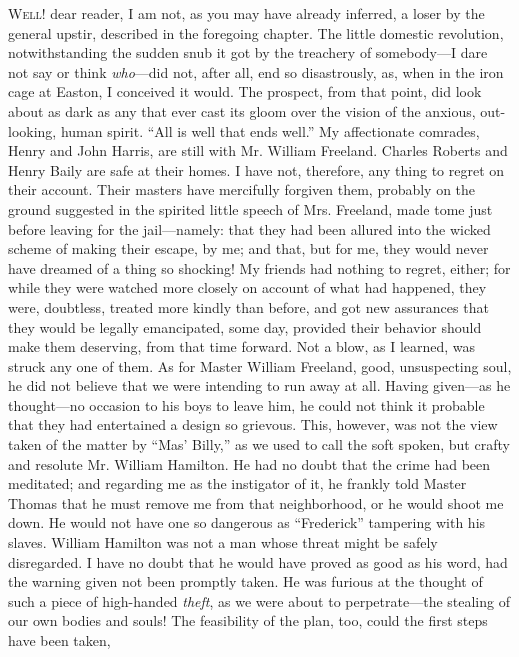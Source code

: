 \textsc{Well!} dear reader, I am not, as you may have already inferred,
a loser by the general upstir, described in the foregoing chapter. The
little domestic revolution, notwithstanding the sudden snub it got by
the treachery of somebody---I dare not say or think \emph{who}---did
not, after all, end so disastrously, as, when in the iron cage at
Easton, I conceived it would. The prospect, from that point, did look
about as dark as any that ever cast its gloom over the vision of the
anxious, out-looking, human spirit. ``All is well that ends well.'' My
affectionate comrades, Henry and John Harris, are still with Mr. William
Freeland. Charles Roberts and Henry Baily are safe at their homes. I
have not, therefore, any thing to regret on their account. Their masters
have mercifully forgiven them, probably on the ground suggested in the
spirited little speech of Mrs. Freeland, made tome just before
{\protect\hypertarget{305}{}{}}leaving for the jail---namely: that they
had been allured into the wicked scheme of making their escape, by me;
and that, but for me, they would never have dreamed of a thing so
shocking! My friends had nothing to regret, either; for while they were
watched more closely on account of what had happened, they were,
doubtless, treated more kindly than before, and got new assurances that
they would be legally emancipated, some day, provided their behavior
should make them deserving, from that time forward. Not a blow, as I
learned, was struck any one of them. As for Master William Freeland,
good, unsuspecting soul, he did not believe that we were intending to
run away at all. Having given---as he thought---no occasion to his boys
to leave him, he could not think it probable that they had entertained a
design so grievous. This, however, was not the view taken of the matter
by ``Mas' Billy,'' as we used to call the soft spoken, but crafty and
resolute Mr. William Hamilton. He had no doubt that the crime had been
meditated; and regarding me as the instigator of it, he frankly told
Master Thomas that he must remove me from that neighborhood, or he would
shoot me down. He would not have one so dangerous as ``Frederick''
tampering with his slaves. William Hamilton was not a man whose threat
might be safely disregarded. I have no doubt that he would have proved
as good as his word, had the warning given not been promptly taken. He
was furious at the thought of such a piece of high-handed \emph{theft},
as we were about to perpetrate---the stealing of our own bodies and
souls! The feasibility of the plan, too,
{\protect\hypertarget{306}{}{}}could the first steps have been taken,
